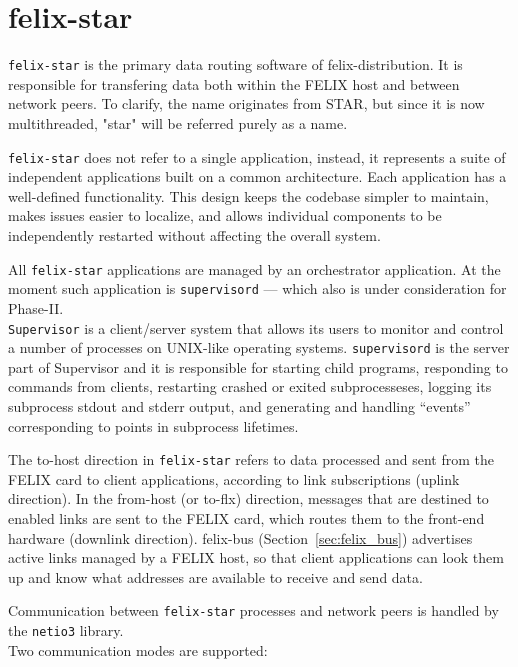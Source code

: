 \chapter{felix-star}
\label{chap:felix_star}

\texttt{felix-star} \cite{felix-software-specs} is the primary data routing software of felix-distribution. It is responsible for transfering data both within the \acs{FELIX} host and between network peers. To clarify, the name originates from \ac{STAR}, but since it is now multithreaded, "star" will be referred purely as a name.

\texttt{felix-star} does not refer to a single application, instead, it represents a suite of independent applications built on a common architecture. Each application has a well-defined functionality. This design keeps the codebase simpler to maintain, makes issues easier to localize, and allows individual components to be independently restarted without affecting the overall system.

All \texttt{felix-star} applications are managed by an orchestrator application. At the moment such application is \texttt{supervisord} \cite{supervisord}— which also is under consideration for Phase-II.\\
\texttt{Supervisor} \cite{supervisord} is a client/server system that allows its users to monitor and control a number of processes on UNIX-like operating systems. \texttt{supervisord} is the server part of Supervisor and it is responsible for starting child programs, responding to commands from clients, restarting crashed or exited subprocesseses, logging its subprocess stdout and stderr output, and generating and handling “events” corresponding to points in subprocess lifetimes.

The to-host direction in \texttt{felix-star} refers to data processed and sent from the \acs{FELIX} card to client applications, according to link subscriptions (uplink direction). In the from-host (or to-flx) direction, messages that are destined to enabled links are sent to the \acs{FELIX} card, which routes them to the front-end hardware (downlink direction). felix-bus (Section~\ref{sec:felix_bus}) advertises active links managed by a \acs{FELIX} host, so that client applications can look them up and know what addresses are available to receive and send data.

Communication between \texttt{felix-star} processes and network peers is handled by the \texttt{netio3} library.\\
 Two communication modes are supported:

